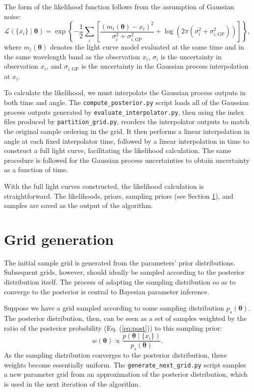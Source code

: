 \documentclass[11pt]{article}
\begin{document}
The form of the likelihood function follows from the assumption of Gaussian noise:
\begin{equation} \label{eq:lnL}
	\mathcal{L}(\{x_i\} \mid \bm{\theta}) = \exp \left \{
			- \frac 1 2 \sum_i \left [ \frac {(m_i(\bm{\theta}) - x_i)^2}
			{\sigma_i^2 + \sigma_{i, \text{GP}}^2}
			+ \log \left (
				2 \pi \left ( 
					\sigma_i^2 + \sigma_{i, \text{GP}}^2
				\right )
			\right ) \right ]
	\right \},
\end{equation}
where $m_i(\bm{\theta})$ denotes the light curve model evaluated at the same time and in the same wavelength band as the observation $x_i$, $\sigma_i$ is the uncertainty in observation $x_i$, and $\sigma_{i, \text{GP}}$ is the uncertainty in the Gaussian process interpolation at $x_i$.

To calculate the likelihood, we must interpolate the Gaussian process outputs in both time and angle. The \texttt{compute\_posterior.py} script loads all of the Gaussian process outputs generated by \texttt{evaluate\_interpolator.py}, then using the index files produced by \texttt{partition\_grid.py}, reorders the interpolator outputs to match the original sample ordering in the grid. It then performs a linear interpolation in angle at each fixed interpolator time, followed by a linear interpolation in time to construct a full light curve, facilitating the likelihood calculation. The same procedure is followed for the Gaussian process uncertainties to obtain uncertainty as a function of time.

With the full light curves constructed, the likelihood calculation is straightforward. The likelihoods, priors, sampling priors (see Section \ref{sec:grid}), and samples are saved as the output of the algorithm.

\section{Grid generation} \label{sec:grid}

The initial sample grid is generated from the parameters' prior distributions. Subsequent grids, however, should ideally be sampled according to the posterior distribution itself. The process of adapting the sampling distribution so as to converge to the posterior is central to Bayesian parameter inference.

Suppose we have a grid sampled according to some sampling distribution $p_s(\bm{\theta})$. The posterior distribution, then, can be seen as a set of samples weighted by the ratio of the posterior probability (Eq. (\ref{eq:post})) to this sampling prior:
\begin{equation} \label{eq:weight}
	w(\bm{\theta}) \propto \frac {p(\bm{\theta} \mid \{x_i\})} {p_s(\bm{\theta})}.
\end{equation}
As the sampling distribution converges to the posterior distribution, these weights become essentially uniform. The \texttt{generate\_next\_grid.py} script samples a new parameter grid from an approximation of the posterior distribution, which is used in the next iteration of the algorithm.
\end{document}

